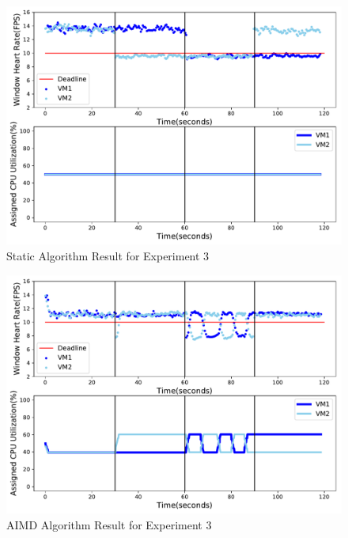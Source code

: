 \begin{figure}[h!]
\centering
\includegraphics[width=1\linewidth]{images/2vm_static}
\caption{Static Algorithm Result for Experiment 3}
\label{2vm_static}
\end{figure}

\begin{figure}[h!]
\centering
\includegraphics[width=1\linewidth]{images/2vm_aimd}
\caption{AIMD Algorithm Result for Experiment 3}
\label{2vm_aimd}
\end{figure}

